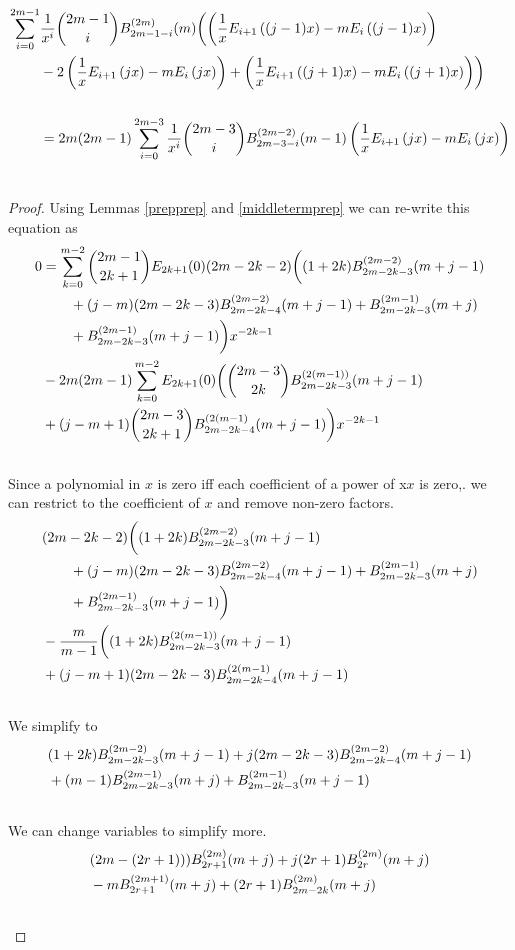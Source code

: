 \documentclass[fleqn,a4paper,9pt]{article}
\begin{document}
\begin{flushleft}
\begin{lemma}\label{middleterm}
\begin{align}
\sum_{i=0}^{2m-1}&\frac{1}{x^i}\binom{2m-1}{i}B_{2m-1-i}^{(2m)}(m)\biggl(\left(\frac{1}{x}E_{i+1}\left((j-1)x\right)-m E_i\left((j-1)x\right)\right)\\\notag
&-2\left(\frac{1}{x}E_{i+1}\left(j x\right)-m E_i\left(j x\right)\right)+\left(\frac{1}{x}E_{i+1}\left((j+1)x\right)-m E_i\left((j+1)x\right)\right)\biggr)\\\notag\\\notag
&=2m(2m-1)\sum_{i=0}^{2m-3}\frac{1}{x^i}\binom{2m-3}{i}B_{2m-3-i}^{(2m-2)}(m-1) \left(\frac{1}{x}E_{i+1}\left(jx\right)-m E_i\left(jx\right)\right)\\\notag
\end{align}
\end{lemma}
\begin{proof}
Using Lemmas \ref{prepprep} and \ref{middletermprep} we can re-write this equation as
\begin{align}
0&=\sum_{k=0}^{m-2}\binom{2m-1}{2k+1}E_{2k+1}(0)(2m-2k-2)\biggl((1+2k)B_{2m-2k-3}^{(2m-2)}(m+j-1)\\\notag
&\  \  \  \  \  \  +(j-m)(2m-2k-3)B_{2m-2k-4}^{(2m-2)}(m+j-1)+B_{2m-2k-3}^{(2m-1)}(m+j)\\\notag
&\  \  \  \  \  \  +B_{2m-2k-3}^{(2m-1)}(m+j-1)\biggr) x^{-2k-1}\\\notag
&-2m(2m-1)\sum_{k=0}^{m-2}E_{2k+1}(0)\biggl(\binom{2m-3}{2k}B_{2m-2k-3}^{(2(m-1))}(m+j-1)\\\notag
&+(j-m+1)\binom{2m-3}{2k+1}B_{2m-2k-4}^{(2(m-1)}(m+j-1)\biggr)x^{-2k-1}\\\notag
\end{align}
Since a polynomial in $x$ is zero iff each coefficient of a power of x$x$ is zero,. we can restrict to the coefficient of $x$ and remove non-zero factors.
\begin{align}
&(2m-2k-2)\biggl((1+2k)B_{2m-2k-3}^{(2m-2)}(m+j-1)\\\notag
&\  \  \  \  \  \  +(j-m)(2m-2k-3)B_{2m-2k-4}^{(2m-2)}(m+j-1)+B_{2m-2k-3}^{(2m-1)}(m+j)\\\notag
&\  \  \  \  \  \  +B_{2m-2k-3}^{(2m-1)}(m+j-1)\biggr) \\\notag
&-\frac{m}{m-1}\biggl((1+2k)B_{2m-2k-3}^{(2(m-1))}(m+j-1)\\\notag
&+(j-m+1)(2m-2k-3)B_{2m-2k-4}^{(2(m-1)}(m+j-1)\\\notag
\end{align}
We simplify to
\begin{align}
&(1+2k)B_{2m-2k-3}^{(2m-2)}(m+j-1) +j(2m-2k-3)B_{2m-2k-4}^{(2m-2)}(m+j-1)\\\notag
&+(m-1)B_{2m-2k-3}^{(2m-1)}(m+j) +B_{2m-2k-3}^{(2m-1)}(m+j-1) \\\notag
\end{align}
We can change variables to simplify more.
\begin{align}
&(2m-(2r+1)))B_{2r+1}^{(2m)}(m+j) +j(2r+1)B_{2r}^{(2m)}(m+j)\\\notag
&-mB_{2r+1}^{(2m+1)}(m+j) +(2r+1)B_{2m-2k}^{(2m)}(m+j) \\\notag
\end{align}


\end{proof}
\end{flushleft}
\end{document}
